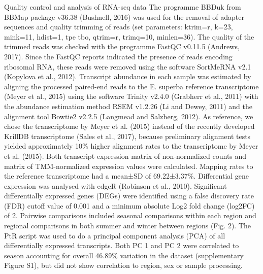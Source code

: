 Quality control and analysis of RNA-seq data
The programme BBDuk from BBMap package v36.38 (Bushnell, 2016) was used for the removal of adapter sequences and quality trimming of reads (set parameters: ktrim=r, k=23, mink=11, hdist=1, tpe tbo, qtrim=r, trimq=10, minlen=36). The quality of the trimmed reads was checked with the programme FastQC v0.11.5 (Andrews, 2017). Since the FastQC reports indicated the presence of reads encoding ribosomal RNA, these reads were removed using the software SortMeRNA v2.1 (Kopylova et al., 2012). Transcript abundance in each sample was estimated by aligning the processed paired-end reads to the E. superba reference transcriptome (Meyer et al., 2015) using the software Trinity v2.4.0 (Grabherr et al., 2011) with the abundance estimation method RSEM v1.2.26 (Li and Dewey, 2011) and the alignment tool Bowtie2 v2.2.5 (Langmead and Salzberg, 2012). As reference, we chose the transcriptome by Meyer et al. (2015) instead of the recently developed KrillDB transcriptome (Sales et al., 2017), because preliminary alignment tests yielded approximately 10\% higher alignment rates to the transcriptome by Meyer et al. (2015). Both transcript expression matrix of non-normalized counts and matrix of TMM-normalized expression values were calculated. Mapping rates to the reference transcriptome had a mean±SD of 69.22±3.37\%. Differential gene expression was analysed with edgeR (Robinson et al., 2010). Significant differentially expressed genes (DEGs) were identified using a false discovery rate (FDR) cutoff value of 0.001 and a minimum absolute Log2 fold change (log2FC) of 2. Pairwise comparisons included seasonal comparisons within each region and regional comparisons in both summer and winter between regions (Fig. 2). The PtR script was used to do a principal component analysis (PCA) of all differentially expressed transcripts. Both PC 1 and PC 2 were correlated to season accounting for overall 46.89\% variation in the dataset (supplementary Figure S1), but did not show correlation to region, sex or sample processing.

